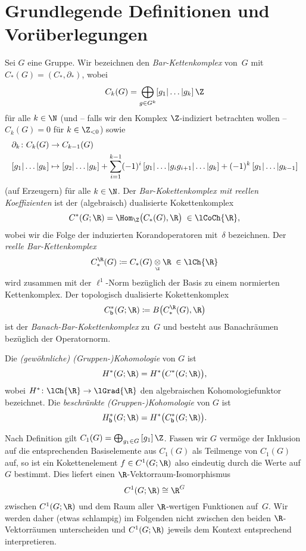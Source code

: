 \section{Grundlegende Definitionen und Vorüberlegungen}
\label{ch3:basics}%
%
Sei $G$ eine Gruppe. Wir bezeichnen den \emph{Bar-Kettenkomplex} von~$G$
mit $C_\ast(G) = (C_\ast,\partial_\ast)$, wobei
\[ C_k(G) = \bigoplus_{g\in G^k} [g_1|\ldots|g_k]\,\Z \]
für alle $k\in\N$ (und -- falls wir den Komplex $\Z$-indiziert betrachten wollen
-- $C_k(G) = 0$ für $k\in\Z_{<0}$) sowie
\begin{align*}
    \partial_k\colon C_k(G) &\to C_{k-1}(G)
    \\
    [g_1|\ldots|g_k] &\mapsto [g_2|\ldots|g_k]
    + \sum_{i=1}^{k-1} (-1)^i \, [g_1|\ldots|g_ig_{i+1}|\ldots|g_k]
    + (-1)^k \, [g_1|\ldots|g_{k-1}]
\end{align*}
(auf Erzeugern) für alle $k\in\N$. Der \emph{Bar-Kokettenkomplex mit reellen
Koeffizienten} ist der (algebraisch) dualisierte Kokettenkomplex
\[ C^\ast(G;\R) = \Hom_\Z\bigl( C_\ast(G), \R \bigr)  \;\in\lCoCh{\R} , \]
wobei wir die Folge der induzierten Korandoperatoren mit~$\delta$ bezeichnen.
Der \emph{reelle Bar-Kettenkomplex}
\[ C_\ast^{\R}(G)
    \defeq C_\ast(G) \underset{\scriptscriptstyle\Z}\otimes \R
    \;\in\lCh{\R}
\]
wird zusammen mit der $\ell^1$-Norm bezüglich der Basis zu einem
normierten Kettenkomplex. Der topologisch dualisierte Kokettenkomplex
\[ \Cb^\ast(G;\R) \defeq B\bigl( C_\ast^{\R}(G), \R \bigr) \]
ist der \emph{Banach-Bar-Kokettenkomplex} zu~$G$ und
besteht aus Banachräumen bezüglich der Operatornorm.

Die \emph{(gewöhnliche) (Gruppen-)Kohomologie} von $G$ ist
\[ H^\ast(G;\R) = H^\ast\bigl( C^\ast(G;\R) \bigr)  , \]
wobei $H^\ast\colon\lCh{\R}\to\lGrad{\R}$ den algebraischen Kohomologiefunktor
bezeichnet. Die \emph{beschränkte (Gruppen-)Kohomologie} von $G$ ist
\[ \Hb^\ast(G;\R) = H^\ast\bigl( \Cb^\ast(G;\R) \bigr)  . \]

Nach Definition gilt $C_1(G) = \bigoplus_{g_1\in G}\, [g_1]\,\Z$. Fassen wir
$G$ vermöge der Inklusion auf die entsprechenden Basiselemente aus $C_1(G)$
als Teilmenge von $C_1(G)$ auf, so ist ein Kokettenelement $f\in C^1(G;\R)$ also 
eindeutig durch die Werte auf $G$ bestimmt. Dies liefert einen
$\R$-Vektorraum-Isomorphismus 
\[ C^1(G;\R) \cong \R^G  \]
zwischen $C^1(G;\R)$ und dem Raum aller $\R$-wertigen Funktionen auf~$G$.
Wir werden daher (etwas schlampig) im Folgenden nicht zwischen den beiden
$\R$-Vektorräumen unterscheiden und $C^1(G;\R)$ jeweils dem Kontext entsprechend
interpretieren.

